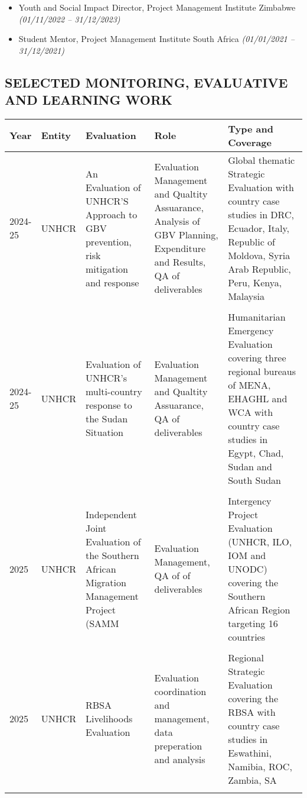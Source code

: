 \documentclass[
  10pt,
]{article}
\begin{document}
\begin{itemize}[itemsep=0.25em, topsep=0.25em]
  \item Youth and Social Impact Director, Project Management Institute Zimbabwe \textit{(01/11/2022 – 31/12/2023)}
  \item Student Mentor, Project Management Institute South Africa \textit{(01/01/2021 – 31/12/2021)}
\end{itemize}

\clearpage
\begin{landscape}

\section{SELECTED MONITORING, EVALUATIVE AND LEARNING WORK}
\begin{tabularx}{\linewidth}{|l|l|X|X|X|}
\hline
Year & Entity & Evaluation & Role & Type and Coverage \\
\hline
2024-25 & UNHCR & An Evaluation of UNHCR'S Approach to GBV prevention, risk mitigation and response & Evaluation Management and Qualtity Assuarance, Analysis of GBV Planning, Expenditure and Results, QA of deliverables & Global thematic Strategic Evaluation with country case studies in DRC, Ecuador, Italy, Republic of Moldova, Syria Arab Republic, Peru, Kenya, Malaysia\\ &&&&  \\
2024-25 & UNHCR & Evaluation of UNHCR's multi-country response to the Sudan Situation & Evaluation Management and Qualtity Assuarance, QA of deliverables & Humanitarian Emergency Evaluation covering three regional bureaus of MENA, EHAGHL and WCA with country case studies in Egypt, Chad, Sudan and South Sudan \\ &&&&  \\
2025 & UNHCR & Independent Joint Evaluation of the Southern African Migration Management Project (SAMM & Evaluation Management, QA of of deliverables & Intergency Project Evaluation (UNHCR, ILO, IOM and UNODC) covering the Southern African Region targeting 16 countries \\ &&&&  \\
2025 & UNHCR & RBSA Livelihoods Evaluation & Evaluation coordination and management, data preperation and analysis & Regional Strategic Evaluation covering the RBSA with country case studies in Eswathini, Namibia, ROC, Zambia, SA \\ &&&& \\

\end{tabularx}
\end{landscape}
\end{document}
